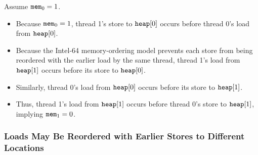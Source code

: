 \begin{table}[!hbt]
\noindent{}
\caption[Stores Are Not Reordered with Older Loads]{Stores Are Not Reordered with Older Loads \cite[Example 8-2]{ref:Intel}}
\label{tbl:litmus:intel:2}
\end{table}

\noindent
Assume $\texttt{mem}_0 = 1$.
\begin{itemize}
  \item Because $\texttt{mem}_0 = 1$, thread 1’s store to $\texttt{heap}[0]$ occurs before thread 0’s load from $\texttt{heap}[0]$.
  \item Because the Intel-64 memory-ordering model prevents each store from being reordered with the earlier load by the same thread, thread 1’s load from $\texttt{heap}[1]$ occurs before its store to $\texttt{heap}[0]$.
  \item Similarly, thread 0’s load from $\texttt{heap}[0]$ occurs before its store to $\texttt{heap}[1]$.
  \item Thus, thread 1’s load from $\texttt{heap}[1]$ occurs before thread 0’s store to $\texttt{heap}[1]$, implying $\texttt{mem}_1 = 0$.
\end{itemize}

\newpage

\subsubsection*{Loads May Be Reordered with Earlier Stores to Different Locations}


